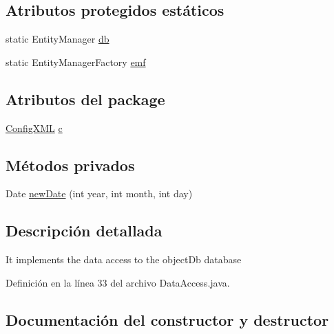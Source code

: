 \subsection*{Atributos protegidos estáticos}
\begin{DoxyCompactItemize}
\item 
static Entity\+Manager \mbox{\hyperlink{classdataAccess_1_1DataAccess_a0920d5a9c61bdae39ef950d6e4e187e4}{db}}
\item 
static Entity\+Manager\+Factory \mbox{\hyperlink{classdataAccess_1_1DataAccess_a158d2718ef5a80f4f296b14937cc1775}{emf}}
\end{DoxyCompactItemize}
\subsection*{Atributos del \textquotesingle{}package\textquotesingle{}}
\begin{DoxyCompactItemize}
\item 
\mbox{\hyperlink{classconfiguration_1_1ConfigXML}{Config\+X\+ML}} \mbox{\hyperlink{classdataAccess_1_1DataAccess_ad09e2bb7e62d0624ad4ed15307cb2e3e}{c}}
\end{DoxyCompactItemize}
\subsection*{Métodos privados}
\begin{DoxyCompactItemize}
\item 
Date \mbox{\hyperlink{classdataAccess_1_1DataAccess_a713f8c4d2e5d5f32a6c66e4e4b096b37}{new\+Date}} (int year, int month, int day)
\end{DoxyCompactItemize}


\subsection{Descripción detallada}
It implements the data access to the object\+Db database 

Definición en la línea 33 del archivo Data\+Access.\+java.



\subsection{Documentación del constructor y destructor}
\mbox{\label{classdataAccess_1_1DataAccess_a7999ee5a7ac4f0295bd0b7764e4f57cf}} 
